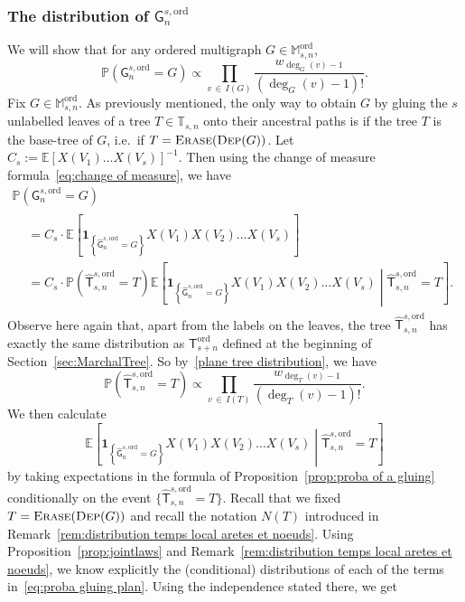 \documentclass[10pt]{amsart}
\theoremstyle{definition}\newtheorem{defi}[theo]{Definition}\newtheorem{rema}[theo]{Remark}\newtheorem{exam}[theo]{Example}\newtheorem{exem}[theo]{Example}\newtheorem{nota}[theo]{Notation}
\newcommand{\Ec}[1]{\mathbb{E} \left[#1\right]}
\newcommand{\Pp}[1]{\mathbb{P} \left(#1\right)}
\newcommand{\Ecsq}[2]{\mathbb{E} \left[#1\mathrel{}\middle|\mathrel{}#2\right]}
\newcommand{\ind}[1]{\mathbf{1}_{\left\lbrace #1 \right\rbrace}}
\newcommand{\Prob}[1]{\ensuremath{\mathbb{P} \left(#1 \right)}}
\newcommand{\ord}{\mathrm{ord}}
\newcommand{\sG}{\mathsf{G}}
\newcommand{\sT}{\mathsf{T}}
\newcommand{\A}{\mathbb{T}}
\newcommand{\M}{\mathbb{M}}
\begin{document}
\subsubsection{The distribution of $\sG_{n}^{s,\ord}$}
We will show that for any ordered multigraph $G\in\M_{s,n}^{\ord}$,
\begin{equation}\label{eq:distribution ordered multigraphs}
\Pp{\sG_{n}^{s,\ord}=G}\propto\prod_{v\,\in\,I(G)}\frac{w_{\deg_G(v)-1}}{\left(\deg_G(v)-1\right)!}.
\end{equation}
Fix $G \in\M_{s,n}^{\ord}$. As previously mentioned, the only way to obtain $G$ by gluing the $s$ unlabelled leaves of a tree $T\in\A_{s,n}$ onto their ancestral paths is if the tree $T$ is the base-tree of $G$, i.e.\ if $T=\textsc{Erase}(\textsc{Dep}(G))$. Let $C_s:=\Ec{X(V_1)\dots X(V_s)}^{-1}$. Then using the change of measure formula~\eqref{eq:change of measure}, we have
\begin{multline}\label{eq:unbiasing}
\Pp{\sG_{n}^{s,\ord}=G}\\
\begin{aligned}
 &=C_s \cdot \Ec{\ind{\widehat{\sG}_{n}^{s,\ord}=G}X(V_1)X(V_2)\dots X(V_s)}\\
&=C_s \cdot \Pp{\widehat{\sT}_{s,n}^{s,\ord}=T}\Ecsq{\ind{\widehat{\sG}_{n}^{s,\ord}=G}X(V_1)X(V_2)\dots X(V_s)}{\widehat{\sT}_{s,n}^{s,\ord}=T}.
\end{aligned}
\end{multline}
Observe here again that, apart from the labels on the leaves, the tree $\widehat{\sT}_{s,n}^{s,\ord}$ has exactly the same distribution as $\sT^{\ord}_{s+n}$ defined at the beginning of Section~\ref{sec:MarchalTree}. So by~\eqref{plane tree distribution}, we have
\begin{equation}\label{eq:tree}
\Prob{\widehat{\sT}_{s,n}^{s,\ord}=T} \propto \prod_{v\,\in\,I(T)}\frac{w_{\deg_T(v)-1}}{(\deg_T(v)-1)!}.
\end{equation}
We then calculate
\[
\Ecsq{\ind{\widehat{\sG}_{n}^{s,\ord}=G}X(V_1)X(V_2)\dots X(V_s)}{\widehat{\sT}_{s,n}^{s,\ord}=T}
\]
by taking expectations in the formula of Proposition~\ref{prop:proba of a gluing} conditionally on the event $\{\widehat{\sT}_{s,n}^{s,\ord}=T\}$. Recall that we fixed $T=\textsc{Erase}(\textsc{Dep}(G))$ and recall the notation $N(T)$ introduced in Remark~\ref{rem:distribution temps local aretes et noeuds}. Using Proposition~\ref{prop:jointlaws} and Remark~\ref{rem:distribution temps local aretes et noeuds}, we know explicitly the (conditional) distributions of each of the terms in~\eqref{eq:proba gluing plan}. Using the independence stated there, we get
\end{document}
